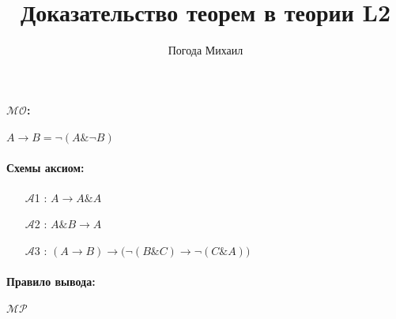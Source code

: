 \documentclass{article}
\author{Погода Михаил}
\title{Доказательство теорем в теории L2}
\begin{document}
\paragraph{$\mathcal{MO}$:} $A\rightarrow B=\neg\left(A\&\neg B\right)$
\paragraph{Схемы аксиом:}
\begin{itemize}
\item[$\mathcal{A}$1]: $A\rightarrow A\&A$
\item[$\mathcal{A}$2]: $A\&B\rightarrow A$
\item[$\mathcal{A}$3]: $\left(A\rightarrow B\right)\rightarrow\bigl(\neg\left(B\&C\right)\rightarrow\neg\left(C\&A\right)\bigr)$
\end{itemize}
\paragraph{Правило вывода:} $\mathcal{MP}$
\end{document}
